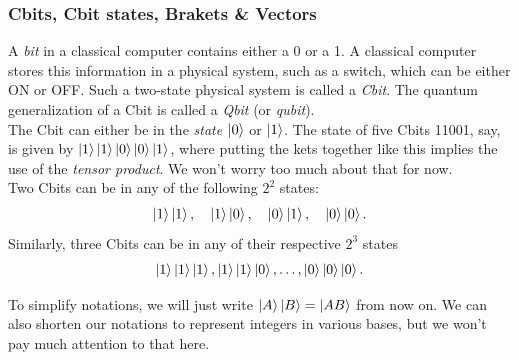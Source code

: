 \documentclass{book}
\theoremstyle{definition}
\begin{document}
\subsubsection{Cbits, Cbit states, Brakets \& Vectors}

A \textit{bit} in a classical computer contains either a 0 or a 1. A classical computer stores this information in a physical system, such as a switch, which can be either ON or OFF. Such a two-state physical system is called a \textit{Cbit}. The quantum generalization of a Cbit is called a \textit{Qbit} (or \textit{qubit}). \\

The Cbit can either be in the \textit{state} $\ket{0}$ or $\ket{1}$. The state of five Cbits 11001, say, is given by $\ket{1}\ket{1}\ket{0}\ket{0}\ket{1}$, where putting the kets together like this implies the use of the \textit{tensor product}. We won't worry too much about that for now. \\

Two Cbits can be in any of the following $2^2$ states:
\begin{align}
\ket{1}\ket{1}, \quad \ket{1}\ket{0}, \quad \ket{0}\ket{1}, \quad \ket{0}\ket{0}.
\end{align}
Similarly, three Cbits can be in any of their respective $2^3$ states
\begin{align}
\ket{1}\ket{1}\ket{1}, \ket{1}\ket{1}\ket{0},\dots,\ket{0}\ket{0}\ket{0}.
\end{align}

To simplify notations, we will just write $\ket{A}\ket{B} = \ket{AB}$ from now on. We can also shorten our notations to represent integers in various bases, but we won't pay much attention to that here. \\
\end{document}
